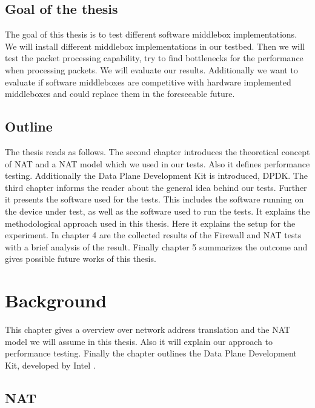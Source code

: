\documentclass[11pt,a4paper,twoside,openright,bachelor,english]{netthesis}
\begin{document}
\section{Goal of the thesis}
The goal of this thesis is to test different software middlebox implementations. We will install different middlebox implementations in our testbed. Then we will test the packet processing capability, try to find bottlenecks for the performance when processing packets. We will evaluate our results. 
Additionally we want to evaluate if software middleboxes are competitive with hardware implemented middleboxes and could replace them in the foreseeable future. 

\section{Outline}

The thesis reads as follows. The second chapter introduces the theoretical concept of NAT and a NAT model which we used in our tests. Also it defines performance testing. Additionally the Data Plane Development Kit is introduced, DPDK. The third chapter informs the reader about the general idea behind our tests. Further it presents the software used for the tests. This includes the software running on the device under test, as well as the software used to run the tests. It explains the methodological approach used in this thesis. Here it explains the setup for the experiment. In chapter 4 are the collected results of the Firewall and NAT tests with a brief analysis of the result. Finally chapter 5 summarizes the outcome and gives possible future works of this thesis. 

\chapter{Background}

This chapter gives a overview over network address translation and the NAT model we will assume in this thesis. Also it will explain our approach to performance testing. Finally the chapter outlines the Data Plane Development Kit, developed by Intel \cite{DPDKOv}.

\section{NAT}
\end{document}
